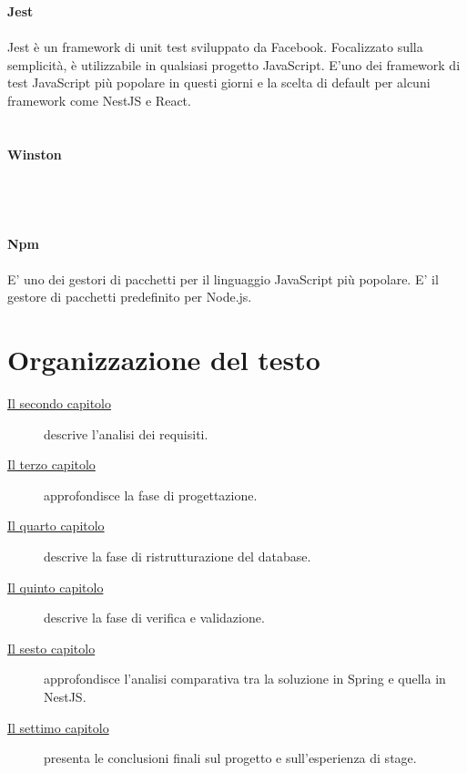 \\\\\\
\textbf{Jest}
\\\\
Jest è un framework di unit test sviluppato da Facebook. Focalizzato sulla semplicità, è utilizzabile in qualsiasi
progetto JavaScript. E'uno dei framework di test JavaScript più popolare in questi giorni e la scelta di default 
per alcuni framework come NestJS e React.
\\\\\\
\textbf{Winston}
\\\\
\\\\\\
\textbf{Npm}
\\\\
E' uno dei gestori di pacchetti per il linguaggio JavaScript più popolare. E' il gestore di pacchetti predefinito 
per Node.js.

\section{Organizzazione del testo}

\begin{description}
    \item[{\hyperref[cap:analisi-requisiti]{Il secondo capitolo}}] descrive l'analisi dei requisiti.
    
    \item[{\hyperref[cap:progettazione]{Il terzo capitolo}}] approfondisce la fase di progettazione.
    
    \item[{\hyperref[cap:ristrutturazione-database]{Il quarto capitolo}}] descrive la fase di ristrutturazione del database.
    
    \item[{\hyperref[cap:verifica-e-validazione]{Il quinto capitolo}}] descrive la fase di verifica e validazione.
    
    \item[{\hyperref[cap:analisi-comparativa]{Il sesto capitolo}}] approfondisce l'analisi comparativa tra la soluzione in Spring e quella in NestJS.
    
    \item[{\hyperref[cap:conclusioni]{Il settimo capitolo}}] presenta le conclusioni finali sul progetto e sull'esperienza di stage.
\end{description}

